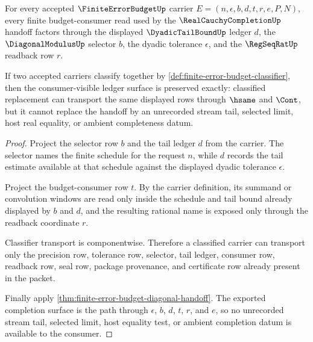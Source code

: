 \begin{theorem}
\label{thm:finite-error-budget-tail-ledger-consumption-exactness}
For every accepted $\FiniteErrorBudgetUp$ carrier
$E=(n,\epsilon,b,d,t,r,e,P,N)$, every finite budget-consumer read used by the
$\RealCauchyCompletionUp$ handoff factors through the displayed
$\DyadicTailBoundUp$ ledger $d$, the $\DiagonalModulusUp$ selector $b$, the
dyadic tolerance $\epsilon$, and the $\RegSeqRatUp$ readback row $r$.

If two accepted carriers classify together by
\autoref{def:finite-error-budget-classifier}, then the consumer-visible
ledger surface is preserved exactly: classified replacement can transport the
same displayed rows through $\hsame$ and $\Cont$, but it cannot replace the
handoff by an unrecorded stream tail, selected limit, host real equality, or
ambient completeness datum.
\end{theorem}
\begin{proof}
Project the selector row $b$ and the tail ledger $d$ from the carrier. The
selector names the finite schedule for the request $n$, while $d$ records the
tail estimate available at that schedule against the displayed dyadic
tolerance $\epsilon$.

Project the budget-consumer row $t$. By the carrier definition, its summand or
convolution windows are read only inside the schedule and tail bound already
displayed by $b$ and $d$, and the resulting rational name is exposed only
through the readback coordinate $r$.

Classifier transport is componentwise. Therefore a classified carrier can
transport only the precision row, tolerance row, selector, tail ledger,
consumer row, readback row, seal row, package provenance, and certificate row
already present in the packet.

Finally apply
\autoref{thm:finite-error-budget-diagonal-handoff}. The exported completion
surface is the path through $\epsilon$, $b$, $d$, $t$, $r$, and $e$, so no
unrecorded stream tail, selected limit, host equality test, or ambient
completion datum is available to the consumer.
\end{proof}

